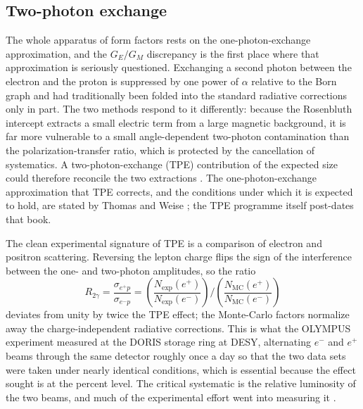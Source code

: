 \FloatBarrier

\subsection{Two-photon exchange}
\label{subsec:two-photon}

The whole apparatus of form factors rests on the one-photon-exchange approximation,
and the $G_{E}/G_{M}$ discrepancy is the first place where that approximation is
seriously questioned. Exchanging a second photon between the electron and the proton
is suppressed by one power of $\alpha$ relative to the Born graph and had traditionally
been folded into the standard radiative corrections only in part. The two methods
respond to it differently: because the Rosenbluth intercept extracts a small electric
term from a large magnetic background, it is far more vulnerable to a small
angle-dependent two-photon contamination than the polarization-transfer ratio, which is
protected by the cancellation of systematics. A two-photon-exchange (TPE) contribution
of the expected size could therefore reconcile the two extractions
\cite[Ch.~14]{Amsler2018}. The one-photon-exchange approximation that TPE corrects, and
the conditions under which it is expected to hold, are stated by Thomas and Weise
\cite[Ch.~2.1]{ThomasWeise2001}; the TPE programme itself post-dates that book.

The clean experimental signature of TPE is a comparison of electron and positron
scattering. Reversing the lepton charge flips the sign of the interference between the
one- and two-photon amplitudes, so the ratio
\begin{equation}
    R_{2\gamma}
    = \frac{\sigma_{e^{+}p}}{\sigma_{e^{-}p}}
    = \left(\frac{N_{\exp}(e^{+})}{N_{\exp}(e^{-})}\right)
      \Bigg/
      \left(\frac{N_{\mathrm{MC}}(e^{+})}{N_{\mathrm{MC}}(e^{-})}\right)
    \label{eq:r2gamma}
\end{equation}
deviates from unity by twice the TPE effect; the Monte-Carlo factors normalize away the
charge-independent radiative corrections. This is what the OLYMPUS experiment measured
at the DORIS storage ring at DESY, alternating $e^{-}$ and $e^{+}$ beams through the same
detector roughly once a day so that the two data sets were taken under nearly identical
conditions, which is essential because the effect sought is at the percent level.
The critical systematic is the relative luminosity of the two beams, and much of the
experimental effort went into measuring it \cite[Ch.~14]{Amsler2018}.

